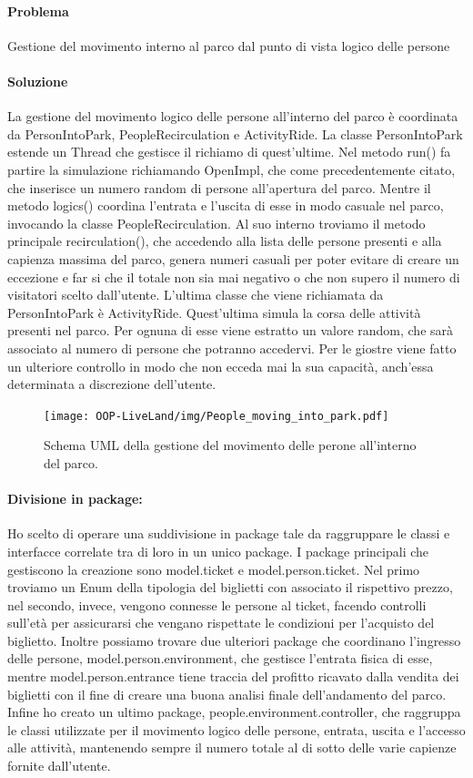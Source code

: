 \documentclass[a4paper,12pt]{report}
\begin{document}
\paragraph{Problema} Gestione del movimento interno al parco dal punto di vista logico delle persone
\paragraph{Soluzione} La gestione del movimento logico delle persone all'interno del parco è coordinata da PersonIntoPark, PeopleRecirculation e ActivityRide.
La classe PersonIntoPark estende un Thread che gestisce il richiamo di quest'ultime.
Nel metodo run() fa partire la simulazione richiamando OpenImpl, che come precedentemente citato, che inserisce un numero random di persone all'apertura del parco.
Mentre il metodo logics() coordina l'entrata e l'uscita di esse in modo casuale nel parco, invocando la classe PeopleRecirculation.
Al suo interno troviamo il metodo principale recirculation(), che accedendo alla lista delle persone presenti e alla capienza massima del parco, genera numeri casuali per poter evitare di creare un eccezione 
e far si che il totale non sia mai negativo o che non supero il numero di visitatori scelto dall'utente.
L'ultima classe che viene richiamata da PersonIntoPark è ActivityRide.
Quest'ultima simula la corsa delle attività presenti nel parco. Per ognuna di esse viene estratto un valore random, che sarà associato al numero di persone che potranno accedervi. Per le giostre viene fatto un ulteriore controllo in modo che non 
ecceda mai la sua capacità, anch'essa determinata a discrezione dell'utente.

\begin{figure}[h]
\centering{}
\texttt{[image: OOP-LiveLand/img/People\_moving\_into\_park.pdf]}
\caption{Schema UML della gestione del movimento delle perone all'interno del parco.}
\label{img:People_Moving}
\end{figure}

\paragraph{Divisione in package:} Ho scelto di operare una suddivisione in package tale da raggruppare le classi e interfacce correlate tra di loro in un unico package. I package principali che gestiscono la creazione sono model.ticket e model.person.ticket. Nel primo troviamo un Enum della tipologia del biglietti con associato il rispettivo prezzo, nel secondo, invece, vengono connesse le persone al ticket, facendo controlli sull’età per assicurarsi che vengano rispettate le condizioni per l’acquisto del biglietto.
Inoltre possiamo trovare due ulteriori package che coordinano l’ingresso delle persone, model.person.environment, che gestisce l’entrata fisica di esse, mentre model.person.entrance tiene traccia del profitto ricavato dalla vendita dei biglietti con il fine di creare una buona analisi finale dell’andamento del parco.
Infine ho creato un ultimo package, people.environment.controller, che raggruppa le classi utilizzate per il movimento logico delle persone, entrata, uscita e l’accesso alle attività, mantenendo sempre il numero totale al di sotto delle varie capienze fornite dall’utente.
\end{document}
